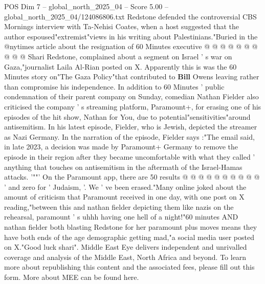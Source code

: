 \begin{textsample}{POS Dim 7 – global\_north\_2025\_04 – Score 5.00 – global\_north\_2025\_04/124086806.txt}
Redstone defended the controversial CBS Mornings interview with Ta-Nehisi Coates, when a host suggested that the author espoused"extremist"views in his writing about Palestinians."Buried in the @nytimes article about the resignation of 60 Minutes executive @ @ @ @ @ @ @ @ @ @ Shari Redstone, complained about a segment on Israel ' s war on Gaza,"journalist Laila Al-Rian posted on X.
Apparently this is was the 60 Minutes story on"The Gaza Policy"that contributed to \textbf{Bill} Owens leaving rather than compromise his independence.
In addition to 60 Minutes ' public condemnation of their parent company on Sunday, comedian Nathan Fielder also criticised the company ' s streaming platform, Paramount+, for erasing one of his episodes of the hit show, Nathan for You, due to potential"sensitivities"around antisemitism.
In his latest episode, Fielder, who is Jewish, depicted the streamer as Nazi Germany.
In the narration of the episode, Fielder says :"The email said, in late 2023, a decision was made by Paramount+ Germany to remove the episode in their region after they became uncomfortable with what they called ' anything that touches on antisemitism in the aftermath of the Israel-Hamas attacks. '""' On the Paramount app, there are 50 results @ @ @ @ @ @ @ @ @ @ ' and zero for ' Judaism, '.
We ' ve been erased."Many online joked about the amount of criticism that Paramount received in one day, with one post on X reading,"between this and nathan fielder depicting them like nazis on the rehearsal, paramount ' s uhhh having one hell of a night!"60 minutes AND nathan fielder both blasting Redstone for her paramount plus moves means they have both ends of the age demographic getting mad,"a social media user posted on X."Good luck shari".
Middle East Eye delivers independent and unrivalled coverage and analysis of the Middle East, North Africa and beyond.
To learn more about republishing this content and the associated fees, please fill out this form.
More about MEE can be found here.

\end{textsample}
